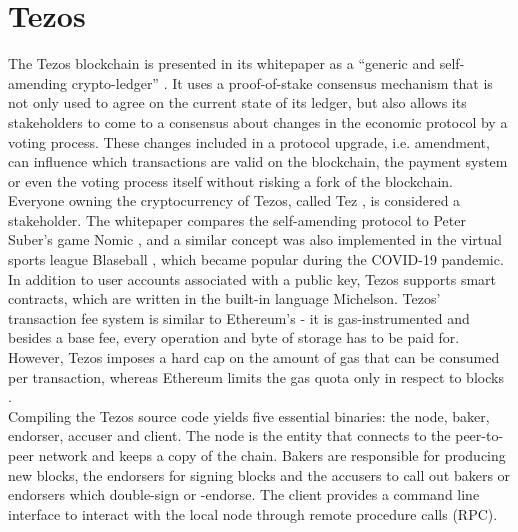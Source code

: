 \chapter{Tezos}
The Tezos blockchain is presented in its whitepaper as a \enquote{generic and self-amending crypto-ledger} \cite{goodman_tezos_2014}. It uses a proof-of-stake consensus mechanism that is not only used to agree on the current state of its ledger, but also allows its stakeholders to come to a consensus about changes in the economic protocol by a voting process. These changes included in a protocol upgrade, i.e. amendment, can influence which transactions are valid on the blockchain, the payment system or even the voting process itself without risking a fork of the blockchain. Everyone owning the cryptocurrency of Tezos, called Tez , is considered a stakeholder. The whitepaper compares the self-amending protocol to Peter Suber's game Nomic \cite{nomic}, and a similar concept was also implemented in the virtual sports league Blaseball \cite{blaseball}, which became popular during the COVID-19 pandemic. In addition to user accounts associated with a public key, Tezos supports smart contracts, which are written in the built-in language Michelson. Tezos' transaction fee system is similar to Ethereum's - it is gas-instrumented and besides a base fee, every operation and byte of storage has to be paid for. However, Tezos imposes a hard cap on the amount of gas that can be consumed per transaction, whereas Ethereum limits the gas quota only in respect to blocks \cite{wood_ethereum_2021}.\\
Compiling the Tezos source code yields five essential binaries: the node, baker, endorser, accuser and client. The node is the entity that connects to the peer-to-peer network and keeps a copy of the chain. Bakers are responsible for producing new blocks, the endorsers for signing blocks and the accusers to call out bakers or endorsers which double-sign or -endorse. The client provides a command line interface to interact with the local node through remote procedure calls (RPC).

